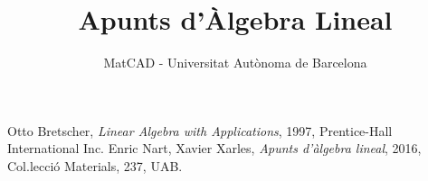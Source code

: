 \documentclass[a4paper,12pt,twoside]{article}
\title{Apunts d'Àlgebra Lineal}
\author{MatCAD - Universitat Autònoma de Barcelona}
\renewcommand{\1}{\mathbf{1}}
\newcommand{\0}{\mathbf{0}}
\theoremstyle{definition}
\theoremstyle{remark}
\begin{document}
\maketitle
\tableofcontents
\newpage
 






\printindex
\begin{thebibliography}{20}
	Otto Bretscher,
	\textit{Linear Algebra with Applications},
	1997, Prentice-Hall International Inc.
	Enric Nart, Xavier Xarles,
	\textit{Apunts d'àlgebra lineal}, 2016, Col.lecci\'o Materials, 237, UAB.
\end{thebibliography}
\end{document}
